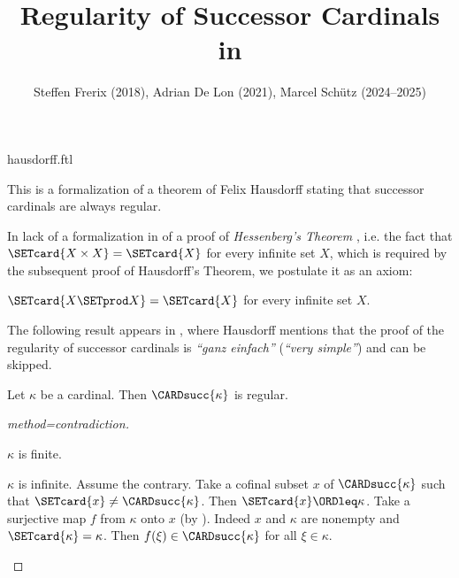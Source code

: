 \documentclass{stex}
\title{Regularity of Successor Cardinals in \Naproche}
\author{Steffen Frerix (2018), Adrian De Lon (2021), Marcel Schütz (2024--2025)}
\date{}
\begin{document}
\begin{smodule}{hausdorff.ftl}
\maketitle


\noindent This is a formalization of a theorem of Felix Hausdorff stating that
successor cardinals are always regular.

In lack of a formalization in \Naproche of a proof of \emph{Hessenberg's
Theorem} \cite{Hessenberg1906}, i.e. the fact that
$\SETcard{X \times X} = \SETcard{X}$ for every
infinite set $X$, which is required by the subsequent
proof of Hausdorff's Theorem, we postulate it as an axiom:

\begin{axiom*}[forthel,title=Hessenberg's Theorem,id=hessenberg]
  $\SETcard{X \SETprod X} = \SETcard{X}$ for every infinite set $X$.
\end{axiom*}

The following result appears in \cite[p.~443]{Hausdorff1908},
where Hausdorff mentions that the proof of the regularity of successor
cardinals is \textit{``ganz einfach''} (\textit{``very simple''})
and can be skipped.

\begin{forthel}
  \begin{theorem*}[title=Hausdorff]
    Let $\kappa$ be a cardinal.
    Then $\CARDsucc{\kappa}$ is regular.
  \end{theorem*}
  \begin{proof}[method=contradiction]
    \begin{case}{$\kappa$ is finite.} \end{case}

    \begin{case}{$\kappa$ is infinite.}
      Assume the contrary.
      Take a cofinal subset $x$ of $\CARDsucc{\kappa}$ such that $\SETcard{x} \neq \CARDsucc{\kappa}$.
      Then $\SETcard{x} \ORDleq \kappa$.
      Take a surjective map $f$ from $\kappa$ onto $x$ (by ).
      Indeed $x$ and $\kappa$ are nonempty and $\SETcard{\kappa} = \kappa$.
      Then $f(\xi) \in \CARDsucc{\kappa}$ for all $\xi \in \kappa$.
  

\end{case}
\end{proof}
\end{forthel}
\end{smodule}
\end{document}

